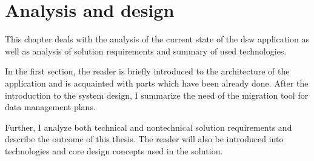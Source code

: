 \chapter{Analysis and design}

This chapter deals with the analysis of the current state of the \gls{dsw} application as well as analysis of solution requirements and summary of used technologies.

In the first section, the reader is briefly introduced to the architecture of the application and is acquainted with parts which have been already done.
After the introduction to the system design, I summarize the need of the migration tool for data management plans.

Further, I analyze both technical and nontechnical solution requirements and describe the outcome of this thesis.
The reader will also be introduced into technologies and core design concepts used in the solution.
